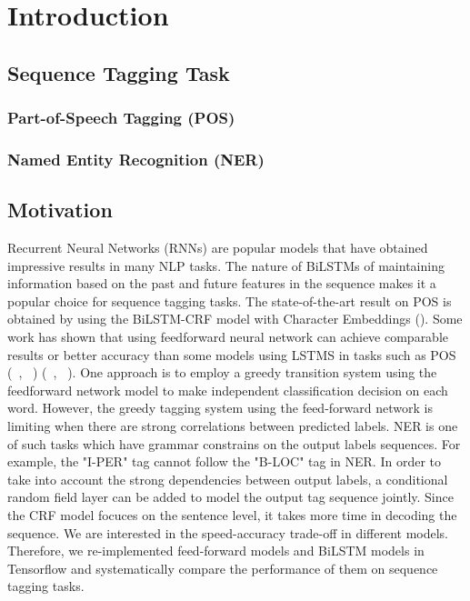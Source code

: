 \documentclass{sfuthesis}
\begin{document}
\mainmatter%

\chapter{Introduction}


\section{Sequence Tagging Task}
\subsection{Part-of-Speech Tagging (POS)}
\subsection{Named Entity Recognition (NER)}
\section{Motivation}

Recurrent Neural Networks (RNNs) are popular models that have obtained impressive results in many NLP tasks. The nature of BiLSTMs of maintaining information based on the past and future features in the sequence makes it a popular choice for sequence tagging tasks. The state-of-the-art result on POS is obtained by using the BiLSTM-CRF model with Character Embeddings (). Some work has shown that using feedforward neural network can achieve comparable results or better accuracy than some models using LSTMS in tasks such as POS (~\citeauthor{schmid1994part}, ~\citeyear{schmid1994part}) (~\citeauthor{andor2016globally}, ~\citeyear{andor2016globally}). One approach is to employ a greedy transition system using the feedforward network model to make independent classification decision on each word. However, the greedy tagging system using the feed-forward network is limiting when there are strong correlations between predicted labels. NER is one of such tasks which have grammar constrains on the output labels sequences. For example, the "I-PER" tag cannot follow the "B-LOC" tag in NER. In order to take into account the strong dependencies between output labels, a conditional random field layer can be added to model the output tag sequence jointly. Since the CRF model focuces on the sentence level, it takes more time in decoding the sequence. We are interested in the speed-accuracy trade-off in different models. Therefore, we re-implemented feed-forward models and BiLSTM models in Tensorflow and systematically compare the performance of them on sequence tagging tasks.
\end{document}
